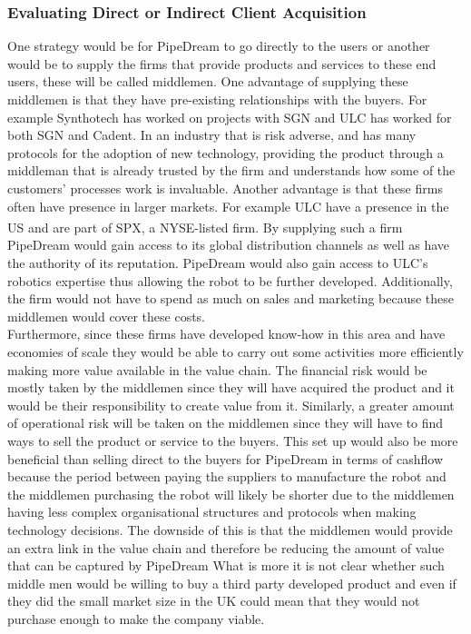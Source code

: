 \documentclass[11pt]{article}		%
\newcommand{\supercite}[1]{\textsuperscript{\cite{#1}}}		%
\begin{document}
    \subsubsection{Evaluating Direct or Indirect Client Acquisition}
            One strategy would be for PipeDream to go directly to the users or another would be to supply the firms that provide products and services to these end users, these will be called middlemen.
           One advantage of supplying these middlemen is that they have pre-existing relationships with the buyers. For example Synthotech has worked on projects with SGN and ULC has worked for both SGN and Cadent. In an industry that is risk adverse, and has many protocols for the adoption of new technology, providing the product through a middleman that is already trusted by the firm and understands how some of the customers’ processes work is invaluable. Another advantage is that these firms often have presence in larger markets. For example ULC have a presence in the US and are part of SPX, a NYSE-listed firm.\supercite{SPX_acquisition} By supplying such a firm PipeDream would gain access to its global distribution channels as well as have the authority of its reputation. PipeDream would also gain access to ULC’s robotics expertise thus allowing the robot to be further developed. Additionally, the firm would not have to spend as much on sales and marketing because these middlemen would cover these costs.
            \\
            Furthermore, since these firms have developed know-how in this area and have economies of scale they would be able to carry out some activities more efficiently making more value available in the value chain. The financial risk would be mostly taken by the middlemen since they will have acquired the product and it would be their responsibility to create value from it. Similarly, a greater amount of operational risk will be taken on the middlemen since they will have to find ways to sell the product or service to the buyers. This set up would also be more beneficial than selling direct to the buyers for PipeDream in terms of cashflow because the period between paying the suppliers to manufacture the robot and the middlemen purchasing the robot will likely be shorter due to the middlemen having less complex organisational structures and protocols when making technology decisions. The downside of this is that the middlemen would provide an extra link in the value chain and therefore be reducing the amount of value that can be captured by PipeDream What is more it is not clear whether such middle men would be willing to buy a third party developed product and even if they did the small market size in the UK could mean that they would not purchase enough to make the company viable. 
\end{document}
